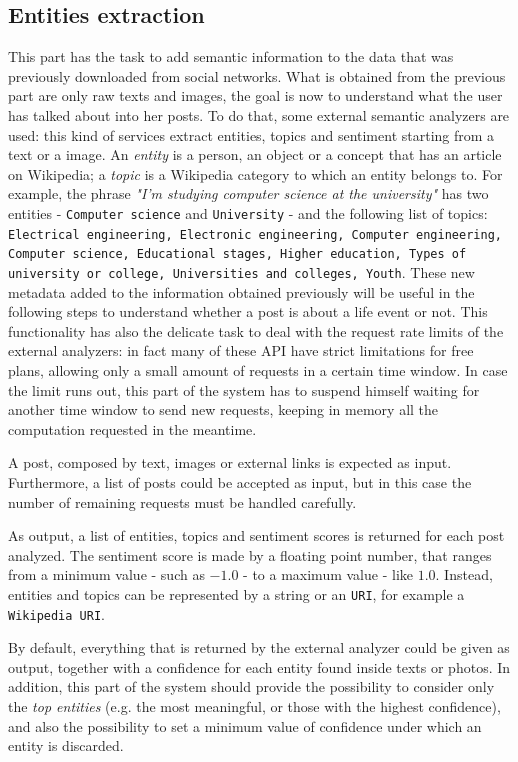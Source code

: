 \subsection{Entities extraction}
This part has the task to add semantic information to the data that was previously downloaded from social networks. What is obtained from the previous part are only raw texts and images, the goal is now to understand what the user has talked about into her posts. To do that, some external semantic analyzers are used: this kind of services extract entities, topics and sentiment starting from a text or a image. An \emph{entity} is a person, an object or a concept that has an article on Wikipedia; a \emph{topic} is a Wikipedia category to which an entity belongs to. For example, the phrase \textit{"I'm studying computer science at the university"} has two entities - \texttt{Computer science} and \texttt{University} - and the following list of topics: \texttt{Electrical engineering, Electronic engineering, Computer engineering, Computer science, Educational stages, Higher education, Types of university or col\-le\-ge, Universities and colleges, Youth}. These new metadata added to the information obtained previously will be useful in the following steps to understand whether a post is about a life event or not. This functionality has also the delicate task to deal with the request rate limits of the external analyzers: in fact many of these API have strict limitations for free plans, allowing only a small amount of requests in a certain time window. In case the limit runs out, this part of the system has to suspend himself waiting for another time window to send new requests, keeping in memory all the computation requested in the meantime.

A post, composed by text, images or external links is expected as input. Furthermore, a list of posts could be accepted as input, but in this case the number of remaining requests must be handled carefully.

As output, a list of entities, topics and sentiment scores is returned for each post analyzed. The sentiment score is made by a floating point number, that ranges from a minimum value - such as $ -1.0 $ - to a maximum value - like $ 1.0 $. Instead, entities and topics can be represented by a string or an \texttt{URI}, for example a \texttt{Wikipedia URI}.

By default, everything that is returned by the external analyzer could be given as output, together with a confidence for each entity found inside texts or photos. In addition, this part of the system should provide the possibility to consider only the \emph{top entities} (e.g. the most meaningful, or those with the highest confidence), and also the possibility to set a minimum value of confidence under which an entity is discarded.

